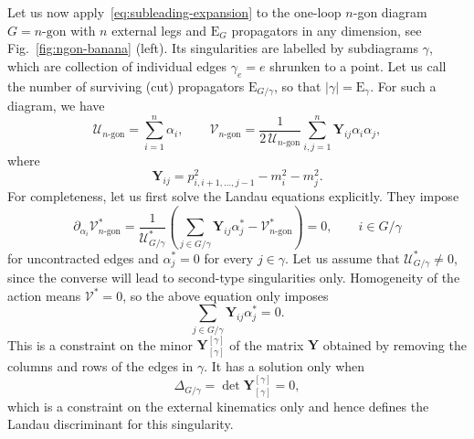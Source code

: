 \documentclass[12pt]{article}
\numberwithin{figure}{section}
\def \be {\begin{equation}}
\def \ee {\end{equation}}
\def \E {\mathrm{E}}
\def \U {\mathcal{U}}
\def \V {\mathcal{V}}
\def \Y {\mathbf{Y}}
\begin{document}
		        Let us now apply~\eqref{eq:subleading-expansion} to the one-loop $n$-gon diagram $G=n\text{-gon}$ with $n$ external legs and $\E_G$ propagators in any dimension, see Fig.~\ref{fig:ngon-banana} (left). Its singularities are labelled by subdiagrams $\gamma$, which are collection of individual edges $\gamma_e = e$ shrunken to a point. Let us call the number of surviving (cut) propagators $\E_{G /\gamma}$, so that $|\gamma| = \E_{\gamma}$. For such a diagram, we have
		        \be
		        \U_{n\text{-gon}} = \sum_{i=1}^{n} \alpha_i, \qquad
		        \V_{n\text{-gon}} = \frac{1}{2 \, \U_{n\text{-gon}}} \sum_{i,j=1}^n \Y_{ij} \alpha_i \alpha_j,
		        \label{eq:U-V-one-loop}
		        \ee
		        where
		        \be
		        \Y_{ij} = p_{i,i+1,\ldots,j-1}^2 - m_i^2 - m_j^2.
		        \ee
		        For completeness, let us first solve the Landau equations explicitly. They impose
		        \be\label{eq:partial-V-star}
		        \partial_{\alpha_i}\V_{n\text{-gon}}^\ast =  \frac{1}{\U_{G/\gamma}^\ast} \left(  \sum_{j \in G/\gamma} \Y_{ij}\alpha_j^\ast
		        -\V^\ast_{n\text{-gon}} \right) = 0, \qquad i\in G/\gamma
		        \ee
		        for uncontracted edges and $\alpha_j^\ast = 0$ for every $j \in \gamma$. Let us assume that $\U^\ast_{G/\gamma} \neq 0$, since the converse will lead to second-type singularities only. Homogeneity of the action means $\V^\ast = 0$, so the above equation only imposes
		        \be\label{eq:Y-alpha}
		        \sum_{j \in G/\gamma} \Y_{ij} \alpha_{j}^\ast = 0.
		        \ee
		        This is a constraint on the minor $\Y_{[\gamma]}^{[\gamma]}$ of the matrix $\Y$ obtained by removing the columns and rows of the edges in $\gamma$. It has a solution only when
		        \be\label{eq:Delta-Ggamma}
		        \Delta_{G/\gamma} = \det \Y^{[\gamma]}_{[\gamma]} = 0,
		        \ee
		        which is a constraint on the external kinematics only and hence defines the Landau discriminant for this singularity.
\end{document}
